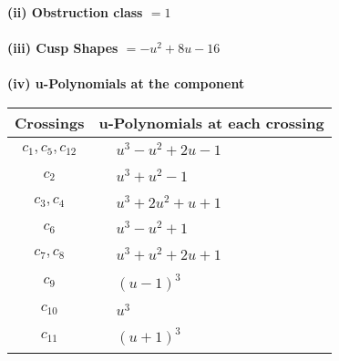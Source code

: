 \documentclass[1p]{elsarticle_modified}
\theoremstyle{definition}
\begin{document}
\flushleft \textbf{(ii) Obstruction class $= 1$}\\~\\
\flushleft \textbf{(iii) Cusp Shapes $= - u^2+8 u-16$}\\~\\
\newpage\renewcommand{\arraystretch}{1}
\flushleft \textbf{(iv) u-Polynomials at the component}\newline \\
\begin{tabular}{m{50pt}|m{274pt}}
Crossings & \hspace{64pt}u-Polynomials at each crossing \\
\hline $$\begin{aligned}c_{1},c_{5},c_{12}\end{aligned}$$&$\begin{aligned}
&u^3- u^2+2 u-1
\end{aligned}$\\
\hline $$\begin{aligned}c_{2}\end{aligned}$$&$\begin{aligned}
&u^3+u^2-1
\end{aligned}$\\
\hline $$\begin{aligned}c_{3},c_{4}\end{aligned}$$&$\begin{aligned}
&u^3+2 u^2+u+1
\end{aligned}$\\
\hline $$\begin{aligned}c_{6}\end{aligned}$$&$\begin{aligned}
&u^3- u^2+1
\end{aligned}$\\
\hline $$\begin{aligned}c_{7},c_{8}\end{aligned}$$&$\begin{aligned}
&u^3+u^2+2 u+1
\end{aligned}$\\
\hline $$\begin{aligned}c_{9}\end{aligned}$$&$\begin{aligned}
&(u-1)^3
\end{aligned}$\\
\hline $$\begin{aligned}c_{10}\end{aligned}$$&$\begin{aligned}
&u^3
\end{aligned}$\\
\hline $$\begin{aligned}c_{11}\end{aligned}$$&$\begin{aligned}
&(u+1)^3
\end{aligned}$\\
\hline
\end{tabular}\\~\\
\end{document}
